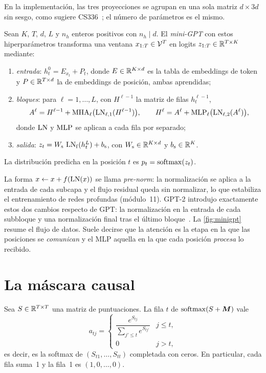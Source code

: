 En la implementación, las tres proyecciones se agrupan en una sola matriz $d\times 3d$ sin sesgo, como sugiere CS336~\cite[§3.4]{cs336}; el número de parámetros es el mismo.

\begin{definicion}\label{def:minigpt}
Sean $K$, $T$, $d$, $L$ y $n_h$ enteros positivos con $n_h\mid d$. El \emph{mini-GPT} con estos hiperparámetros transforma una ventana $x_{1:T}\in\mathcal{V}^{T}$ en logits $z_{1:T}\in\mathbb{R}^{T\times K}$ mediante:
\begin{enumerate}[label=(\arabic*)]
  \item \emph{entrada}: $h^{0}_t=E_{x_t}+P_t$, donde $E\in\mathbb{R}^{K\times d}$ es la tabla de embeddings de token y $P\in\mathbb{R}^{T\times d}$ la de embeddings de posición, ambas aprendidas;
  \item \emph{bloques}: para $\ell=1,\dots,L$, con $H^{\ell-1}$ la matriz de filas $h^{\ell-1}_t$,
  \[
  A^{\ell}=H^{\ell-1}+\operatorname{MHA}_{\ell}\bigl(\operatorname{LN}_{\ell,1}(H^{\ell-1})\bigr),\qquad
  H^{\ell}=A^{\ell}+\operatorname{MLP}_{\ell}\bigl(\operatorname{LN}_{\ell,2}(A^{\ell})\bigr),
  \]
  donde $\operatorname{LN}$ y $\operatorname{MLP}$ se aplican a cada fila por separado;
  \item \emph{salida}: $z_t=W_{\mathrm{s}}\,\operatorname{LN}_{\mathrm{f}}(h^{L}_t)+b_{\mathrm{s}}$, con $W_{\mathrm{s}}\in\mathbb{R}^{K\times d}$ y $b_{\mathrm{s}}\in\mathbb{R}^{K}$.
\end{enumerate}
La distribución predicha en la posición $t$ es $p_t=\operatorname{softmax}(z_t)$.
\end{definicion}

La forma $x\leftarrow x+f(\operatorname{LN}(x))$ se llama \emph{pre-norm}: la normalización se aplica a la entrada de cada subcapa y el flujo residual queda sin normalizar, lo que estabiliza el entrenamiento de redes profundas (módulo~11). GPT-2 introdujo exactamente estos dos cambios respecto de GPT: la normalización en la entrada de cada subbloque y una normalización final tras el último bloque~\cite[§2.3]{gpt2}. La \cref{fig:minigpt} resume el flujo de datos. Suele decirse que la atención es la etapa en la que las posiciones se \emph{comunican} y el MLP aquella en la que cada posición \emph{procesa} lo recibido.

\addtocounter{figure}{1}%

\section{La máscara causal}

\begin{lema}\label{lem:mascara}
Sea $S\in\mathbb{R}^{T\times T}$ una matriz de puntuaciones. La fila $t$ de $\operatorname{softmax}(S+\bm{M})$ vale
\[
a_{tj}=\begin{cases}\dfrac{e^{S_{tj}}}{\sum_{j'\le t}e^{S_{tj'}}} & j\le t,\\[3mm] 0 & j>t,\end{cases}
\]
es decir, es la softmax de $(S_{t1},\dots,S_{tt})$ completada con ceros. En particular, cada fila suma~1 y la fila~1 es $(1,0,\dots,0)$.
\end{lema}

